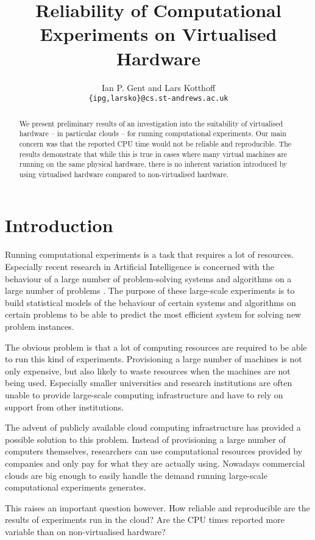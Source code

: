 \documentclass{llncs}
\title{Reliability of Computational Experiments on Virtualised Hardware}
\author{Ian P. Gent and Lars Kotthof\/f\\
\texttt{\{ipg,larsko\}@cs.st-andrews.ac.uk}}
\institute{University of St Andrews}
\begin{document}
\maketitle

\begin{abstract}
We present preliminary results of an investigation into the suitability of
virtualised hardware -- in particular clouds -- for running computational
experiments. Our main concern was that the reported CPU time would not be
reliable and reproducible. The results demonstrate that while this is true in
cases where many virtual machines are running on the same physical hardware,
there is no inherent variation introduced by using virtualised hardware compared
to non-virtualised hardware.
\end{abstract}

\section{Introduction}

Running computational experiments is a task that requires a lot of resources.
Especially recent research in Artificial Intelligence is concerned with the
behaviour of a large number of problem-solving systems and algorithms on a
large number of problems \citep{satzilla,ensemble}. The purpose of these
large-scale experiments is to build statistical models of the behaviour of
certain systems and algorithms on certain problems to be able to predict the
most efficient system for solving new problem instances.

The obvious problem is that a lot of computing resources are required to be able
to run this kind of experiments. Provisioning a large number of machines is not
only expensive, but also likely to waste resources when the machines are not
being used. Especially smaller universities and research institutions are often
unable to provide large-scale computing infrastructure and have to rely on
support from other institutions.

The advent of publicly available cloud computing infrastructure has provided a
possible solution to this problem. Instead of provisioning a large number of
computers themselves, researchers can use computational resources provided by
companies and only pay for what they are actually using. Nowadays commercial
clouds are big enough to easily handle the demand running large-scale
computational experiments generates.

This raises an important question however. How reliable and reproducible are the
results of experiments run in the cloud? Are the CPU times reported more
variable than on non-virtualised hardware?
\end{document}
